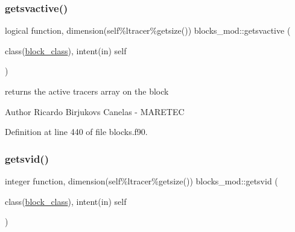 \subsubsection{\texorpdfstring{getsvactive()}{getsvactive()}}
{\footnotesize\ttfamily logical function, dimension(self\%ltracer\%getsize()) blocks\+\_\+mod\+::getsvactive (\begin{DoxyParamCaption}\item[{class(\mbox{\hyperlink{structblocks__mod_1_1block__class}{block\+\_\+class}}), intent(in)}]{self }\end{DoxyParamCaption})\hspace{0.3cm}{\ttfamily [private]}}



returns the active tracers array on the block 

\begin{DoxyAuthor}{Author}
Ricardo Birjukovs Canelas -\/ M\+A\+R\+E\+T\+EC 
\end{DoxyAuthor}


Definition at line 440 of file blocks.\+f90.


\mbox{\label{namespaceblocks__mod_af9cfa830fff1b8986efba72fa4c82473}} 
\subsubsection{\texorpdfstring{getsvid()}{getsvid()}}
{\footnotesize\ttfamily integer function, dimension(self\%ltracer\%getsize()) blocks\+\_\+mod\+::getsvid (\begin{DoxyParamCaption}\item[{class(\mbox{\hyperlink{structblocks__mod_1_1block__class}{block\+\_\+class}}), intent(in)}]{self }\end{DoxyParamCaption})\hspace{0.3cm}{\ttfamily [private]}}



